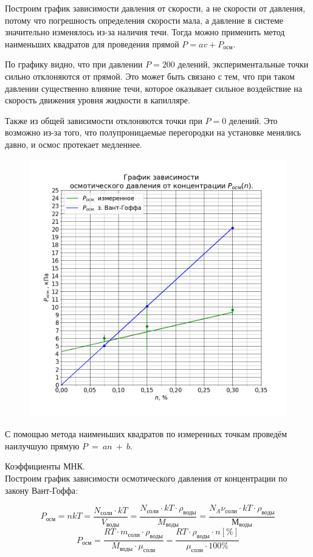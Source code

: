 Построим график зависимости давления от скорости, а не скорости от давления, потому что погрешность определения скорости мала, а давление в системе значительно изменялось из-за наличия течи. Тогда можно применить метод наименьших квадратов для проведения прямой $P = av + P_{осм}$.



\newpage

По графику видно, что при давлении $P = 200$ делений, экспериментальные точки сильно отклоняются от прямой. Это может быть связано с тем, что при таком давлении существенно влияние течи, которое оказывает сильное воздействие на скорость движения уровня жидкости в капилляре.

Также из общей зависимости отклоняются точки при $P = 0$ делений. Это возможно из-за того, что полупроницаемые перегородки на установке менялись давно, и осмос протекает медленнее.

\begin{figure}[H]
	\centering
	\includegraphics[width=1 \textwidth]{../plots/graph_p_osm_n.png}
\end{figure}

\newpage

С помощью метода наименьших квадратов по измеренных точкам проведём наилучшую прямую $P~=~an~+~b$. 

Коэффициенты МНК. \\


Построим график зависимости осмотического давления от концентрации по закону Вант-Гоффа:

$$
P_{осм} = nkT = \frac{N_{соли} \cdot k T}{V_{воды}} = \frac{N_{соли} \cdot k T \cdot \rho_{воды}}{M_{воды}} = \frac{N_A \nu_{соли} \cdot k T \cdot \rho_{воды}}{М_{воды}}
$$
$$
P_{осм} =\frac{RT \cdot m_{соли} \cdot \rho_{воды}}{M_{воды} \cdot \mu_{соли}} = \frac{RT \cdot \rho_{воды} \cdot n[\%]}{\mu_{соли} \cdot 100\%}
$$

